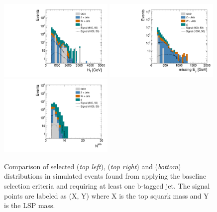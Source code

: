 \begin{figure}[!t]
  \centering
  \begin{minipage}[c]{1.\textwidth}
    \begin{center}
      \includegraphics[width=0.49\textwidth]{figures/Stop_BTag_HThad.pdf}  
      \includegraphics[width=0.49\textwidth]{figures/Stop_BTag_MET.pdf} \\
      \includegraphics[width=0.49\textwidth]{figures/Stop_BTag_N_jets.pdf}
    \end{center}
  \end{minipage}

  \caption{Comparison of selected \HT (\textit{top left}), \met (\textit{top right}) and \NJets (\textit{bottom}) distributions in simulated events found from applying the baseline selection criteria and requiring at least one b-tagged jet. The signal points are labeled as (X, Y) where X is the top squark mass and Y is the LSP mass.}
  \label{fig:stop_baseline_btag_HT_MET_NJets}
\end{figure}
